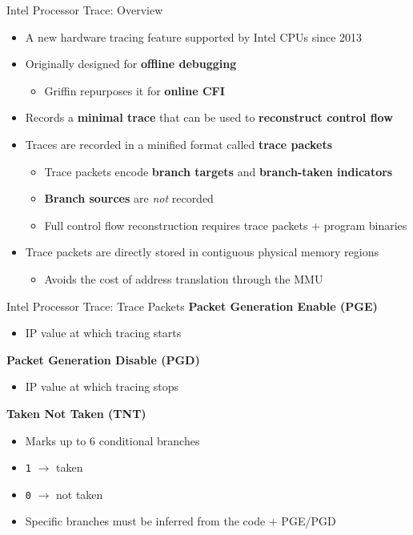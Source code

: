 \documentclass[12pt, dvipsnames, aspectratio=169]{beamer}
\begin{document}
\begin{frame}[c]{Intel Processor Trace: Overview}{}
  \begin{itemize}
    \item A new hardware tracing feature supported by Intel CPUs since 2013

    \vfill
    \item Originally designed for \textbf{offline debugging}
    \begin{itemize}
      \item Griffin repurposes it for \textbf{online CFI}
    \end{itemize}

    \vfill
    \item Records a \textbf{minimal trace} that can be used to \textbf{reconstruct control flow}

    \vfill
    \item Traces are recorded in a minified format called \textbf{trace packets}
    \begin{itemize}
      \item Trace packets encode \textbf{branch targets} and \textbf{branch-taken indicators}
      \item \textbf{Branch sources} are \textit{not} recorded
      \item Full control flow reconstruction requires trace packets + program binaries
    \end{itemize}

    \vfill
    \item Trace packets are directly stored in contiguous physical memory regions
    \begin{itemize}
      \item Avoids the cost of address translation through the MMU
    \end{itemize}
  \end{itemize}
\end{frame}

\begin{frame}[c]{Intel Processor Trace: Trace Packets}{}
{\bf Packet Generation Enable (PGE)}
\begin{itemize}
  \item IP value at which tracing starts
\end{itemize}

\vfill
{\bf Packet Generation Disable (PGD)}
\begin{itemize}
  \item IP value at which tracing stops
\end{itemize}

\vfill
{\bf Taken Not Taken (TNT)}
\begin{itemize}
  \item Marks up to 6 conditional branches
  \item \texttt{1} $\rightarrow$ taken
  \item \texttt{0} $\rightarrow$ not taken
  \item Specific branches must be inferred from the code + PGE/PGD
\end{itemize}
\end{frame}
\end{document}
